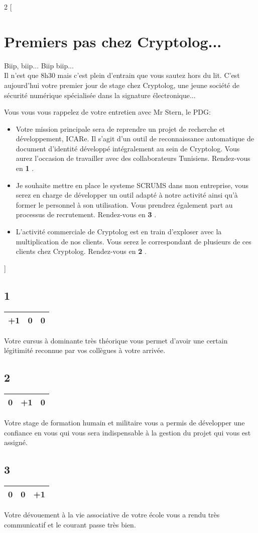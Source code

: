 \documentclass[12pt,a4paper,titlepage]{article}
\newcommand{\n}[1]{\textbf{#1} }
\newcommand{\update}[3]{
\begin{center}
\begin{tabular}{|c|c|c|}
\hline #1 & #2 & #3 \\ \hline
\end{tabular}
\end{center}
}
\begin{document}
\begin{multicols}{2}
[
\section{Premiers pas chez Cryptolog...}
Biip, biip... Biip biip... \\
Il n'est que 8h30 mais c'est plein d'entrain que vous sautez hors du lit. C'est aujourd'hui votre premier jour de stage chez Cryptolog, une jeune société de sécurité numérique spécialisée dans la signature électronique...

Vous vous vous rappelez de votre entretien avec Mr Stern, le PDG:
\begin{itemize}
\item Votre mission principale sera de reprendre un projet de recherche et développement, ICARe. Il s'agit d'un outil de reconnaissance automatique de document d'identité développé intégralement au sein de Cryptolog. Vous aurez l'occasion de travailler avec des collaborateurs Tunisiens. Rendez-vous en \n{1}.
\item Je souhaite mettre en place le systeme SCRUMS dans mon entreprise, vous serez en charge de développer un outil adapté à notre activité ainsi qu'à former le personnel à son utilisation. Vous prendrez également part au processus de recrutement. Rendez-vous en \n{3}.
\item L'activité commerciale de Cryptolog est en train d'exploser avec la multiplication de nos clients. Vous serez le correspondant de plusieurs de ces clients chez Cryptolog. Rendez-vous en \n{2}.
\end{itemize}
]


\label{n1}
\subsection*{1}
\update{+1}{0}{0}
Votre cursus à dominante très théorique vous permet d'avoir une certain légitimité reconnue par vos collègues à votre arrivée.

\label{n2}
\subsection*{2}
\update{0}{+1}{0}
Votre stage de formation humain et militaire vous a permis de développer une confiance en vous qui vous sera indispensable à la gestion du projet qui vous est assigné.

\label{n3}
\subsection*{3}
\update{0}{0}{+1}
Votre dévouement à la vie associative de votre école vous a rendu très communicatif et le courant passe très bien.







\end{multicols}
\end{document}
